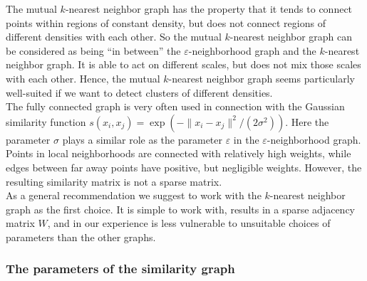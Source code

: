 \documentclass{article}
\newcommand{\norm}[1][\cdot]{\|#1\|}
\newcommand{\eps}{\ensuremath{\varepsilon}}
\renewcommand{\epsilon}{\ensuremath{\varepsilon}}
\begin{document}
%
The mutual $k$-nearest neighbor graph has the property that it tends
to connect points within regions of constant density, but does not
connect regions of different densities with each other.  So the
mutual $k$-nearest neighbor graph can be considered as being ``in between''
the $\epsilon$-neighborhood graph and the $k$-nearest neighbor graph.
It is able to act on different scales, but does not mix those scales
with each other. Hence, the mutual $k$-nearest neighbor graph seems
particularly well-suited if we want to detect clusters of different
densities. \\
%

The fully connected graph is very often used in connection with the
Gaussian similarity function $s(x_i,x_j) = \exp(-
\norm[x_i-x_j]^2/ (2\sigma^2))$. Here the parameter $\sigma$ plays a
similar role as the parameter $\eps$ in the $\eps$-neighborhood graph.
Points in local neighborhoods are connected with relatively high
weights, while edges between far away points have positive, but
negligible weights. However, the resulting similarity matrix is not a
sparse matrix.\\



As a general recommendation we suggest to work with the $k$-nearest
neighbor graph as the first choice. It is simple to work with, results
in a sparse adjacency matrix $W$, and in our experience is less
vulnerable to unsuitable choices of parameters than the other graphs.



%
\subsubsection*{The parameters of the similarity graph} 
%
\end{document}
